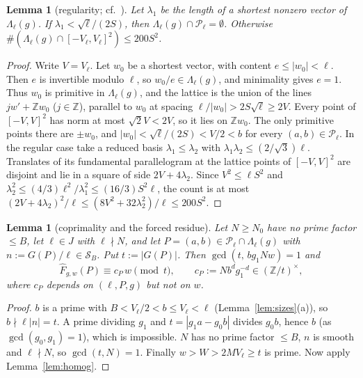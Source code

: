 \documentclass[11pt]{amsart}
\newtheorem{lemma}[theorem]{Lemma}
\theoremstyle{definition}
\newcommand{\Z}{\mathbb{Z}}
\newcommand{\cP}{\mathcal{P}}
\newcommand{\cS}{\mathcal{S}}
\begin{document}
\begin{lemma}[regularity; cf.\ {\cite{pollard1993}}]\label{lem:reg}
Let $\lambda_1$ be the length of a shortest nonzero vector of $\Lambda_\ell(g)$. If $\lambda_1<\sqrt\ell/(2S)$, then
$\Lambda_\ell(g)\cap\cP_\ell=\emptyset$. Otherwise $\#(\Lambda_\ell(g)\cap[-V_\ell,V_\ell]^2)\le200S^2$.
\end{lemma}

\begin{proof}
Write $V=V_\ell$. Let $w_0$ be a shortest vector, with content $e\le|w_0|<\ell$. Then $e$ is invertible modulo $\ell$, so
$w_0/e\in\Lambda_\ell(g)$, and minimality gives $e=1$. Thus $w_0$ is primitive in $\Lambda_\ell(g)$, and the lattice is
the union of the lines $jw'+\Z w_0$ ($j\in\Z$), parallel to $w_0$ at spacing $\ell/|w_0|>2S\sqrt\ell\ge2V$. Every point
of $[-V,V]^2$ has norm at most $\sqrt2V<2V$, so it lies on $\Z w_0$. The only primitive points there are
$\pm w_0$, and $|w_0|<\sqrt\ell/(2S)<V/2<b$ for every $(a,b)\in\cP_\ell$. In the regular case take a reduced basis
$\lambda_1\le\lambda_2$ with $\lambda_1\lambda_2\le(2/\sqrt3)\ell$. Translates of its fundamental parallelogram at the lattice points
of $[-V,V]^2$ are disjoint and lie in a square of side $2V+4\lambda_2$. Since $V^2\le\ell S^2$ and
$\lambda_2^2\le(4/3)\ell^2/\lambda_1^2\le(16/3)S^2\ell$, the count is at most $(2V+4\lambda_2)^2/\ell\le(8V^2+32\lambda_2^2)/\ell\le200S^2$.
\end{proof}

\begin{lemma}[coprimality and the forced residue]\label{lem:coprime}
Let $N\ge N_0$ have no prime factor $\le B$, let $\ell\in J$ with $\ell\nmid N$, and let $P=(a,b)\in\cP_\ell\cap\Lambda_\ell(g)$ with
$n:=G(P)/\ell\in\cS_B$. Put $t:=|G(P)|$. Then $\gcd(t,\,bg_1Nw)=1$ and
\begin{equation}\label{eq:forced}
\hat F_{g,w}(P)\equiv c_P\,w\pmod t,\qquad c_P:=Nb^dg_1^{-d}\in(\Z/t)^\times,
\end{equation}
where $c_P$ depends on $(\ell,P,g)$ but not on $w$.
\end{lemma}

\begin{proof}
$b$ is a prime with $B<V_\ell/2<b\le V_\ell<\ell$ (Lemma~\ref{lem:sizes}(a)), so $b\nmid\ell|n|=t$. A prime dividing $g_1$ and $t=|g_1a-g_0b|$ divides
$g_0b$, hence $b$ (as $\gcd(g_0,g_1)=1$), which is impossible. $N$ has no prime factor $\le B$, $n$ is smooth and $\ell\nmid N$, so
$\gcd(t,N)=1$. Finally $w>W>2MV_\ell\ge t$ is prime. Now apply Lemma~\ref{lem:homog}.
\end{proof}
\end{document}

